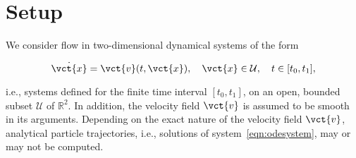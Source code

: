 \section{Setup}
\label{sec:setup}



We consider flow in two-dimensional dynamical systems of the form


\begin{equation}
    \label{eq:odesystem}
\dot{\vct{x}} = \vct{v}(t,\vct{x}),\quad\vct{x}\in\mathcal{U},\quad{}t\in[t_{0},t_{1}],
\end{equation}

i.e., systems defined for the finite time interval $[t_{0},t_{1}]$, on an open,
bounded subset $\mathcal{U}$ of $\mathbb{R}^{2}$. In addition, the velocity
field $\vct{v}$ is assumed to be smooth in its arguments. Depending on the
exact nature of the velocity field $\vct{v}$, analytical particle trajectories,
i.e., solutions of system~\eqref{eqn:odesystem}, may or may not be computed.


